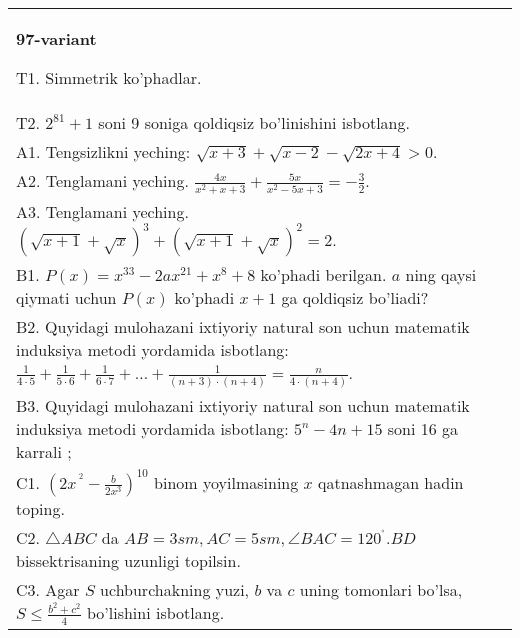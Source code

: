 \documentclass{article}
\begin{document}
\begin{tabular}{m{17cm}}
\textbf{97-variant}
\newline

T1. Simmetrik ko'phadlar. \\
T2. \(2^{81} + 1\) soni 9 soniga qoldiqsiz bo'linishini isbotlang. \\
A1. Tengsizlikni yeching: \(\sqrt{x + 3} + \sqrt{x - 2} - \sqrt{2x + 4} > 0\). \\
A2. Tenglamani yeching. \(\frac{4x}{x^{2} + x + 3} + \frac{5x}{x^{2} - 5x + 3} = - \frac{3}{2}\). \\
A3. Tenglamani yeching. \((\sqrt{x + 1} + \sqrt{x})^{3} + (\sqrt{x + 1} + \sqrt{x})^{2} = 2\). \\
B1. \(P(x) = x^{33} - 2ax^{21} + x^{8} + 8\) ko'phadi berilgan. \(a\) ning qaysi qiymati uchun \(P(x)\) ko'phadi \(x + 1\) ga qoldiqsiz bo'liadi? \\
B2. Quyidagi mulohazani ixtiyoriy natural son uchun matematik induksiya metodi yordamida isbotlang: \(\frac{1}{4 \cdot 5} + \frac{1}{5 \cdot 6} + \frac{1}{6 \cdot 7} + \ldots + \frac{1}{(n + 3) \cdot (n + 4)} = \frac{n}{4 \cdot (n + 4)}\). \\
B3. Quyidagi mulohazani ixtiyoriy natural son uchun matematik induksiya metodi yordamida isbotlang: \(5^{n} - 4n + 15\) soni 16 ga karrali ; \\
C1. \(\left( 2x^{\ ^{2}} - \frac{b}{2x^{3}} \right)^{10}\) binom yoyilmasining \(x\) qatnashmagan hadin toping. \\
C2. \(\bigtriangleup ABC\) da \(AB = 3sm,AC = 5sm,\angle BAC = 120^{{^\circ}}.BD\) bissektrisaning uzunligi topilsin. \\
C3. Agar \(S\) uchburchakning yuzi, \(b\) va \(c\) uning tomonlari bo'lsa, \(S \leq \frac{b^{2} + c^{2}}{4}\) bo'lishini isbotlang. \\

\end{tabular}
\vspace{1cm}
\end{document}
